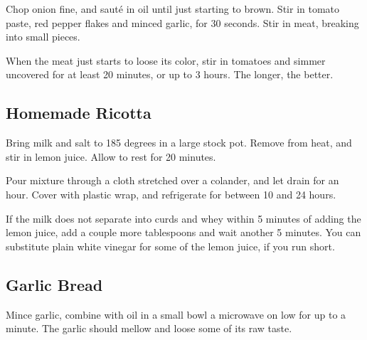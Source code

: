 \begin{recipe}
Chop onion fine, and sauté in oil until just starting to brown. Stir in tomato paste, red pepper flakes and minced garlic, for 30 seconds. Stir in meat, breaking into small pieces.

When the meat just starts to loose its color, stir in tomatoes and simmer uncovered for at least 20 minutes, or up to 3 hours. The longer, the better.

\clearpage

\subsection{Homemade Ricotta}



Bring milk and salt to 185 degrees in a large stock pot. Remove from heat, and stir in lemon juice. Allow to rest for 20 minutes.

Pour mixture through a cloth stretched over a colander, and let drain for an hour. Cover with plastic wrap, and refrigerate for between 10 and 24 hours.

If the milk does not separate into curds and whey within 5 minutes of adding the lemon juice, add a couple more tablespoons and wait another 5 minutes. You can substitute plain white vinegar for some of the lemon juice, if you run short.

\subsection{Garlic Bread}



Mince garlic, combine with oil in a small bowl a microwave on low for up to a minute. The garlic should mellow and loose some of its raw taste.


\end{recipe}
